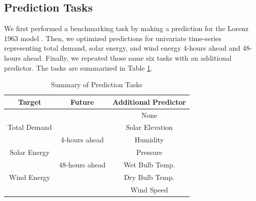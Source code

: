  \subsection{Prediction Tasks}

We first performed a benchmarking task by making a prediction for the Lorenz
1963 model \cite{lorenz_deterministic_1963}. Then, we optimized predictions for
univariate time-series
representing total demand, solar energy, and wind energy 4-hours ahead and
48-hours ahead. Finally, we repeated those same six tasks with an additional
predictor. The tasks are summarized in Table \ref{tab:tasks}.

\begin{table}[h]
  \centering
  \caption{Summary of Prediction Tasks}
  \label{tab:tasks}
  \begin{tabular}{c|c|c}
    \hline
    Target & Future & Additional Predictor\\
    \hline
    && None \\
    Total Demand && Solar Elevation\\
    &4-hours ahead& Humidity\\
    Solar Energy && Pressure\\
    &48-hours ahead& Wet Bulb Temp.\\
    Wind Energy && Dry Bulb Temp.\\
    && Wind Speed\\
  \end{tabular}\\[-1.4pt]%

\end{table}
